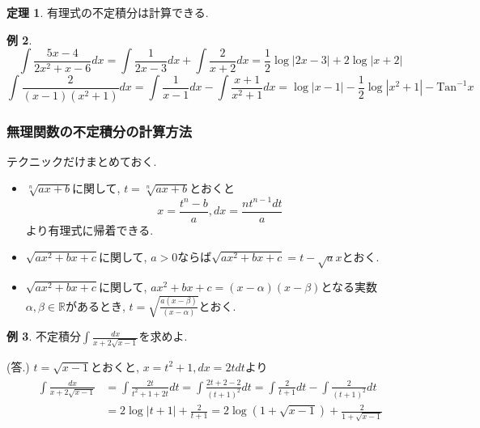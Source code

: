 \documentclass[dvipdfmx,a4paper,11pt]{article}
\newcommand{\R}{\mathbb{R}}
\newcommand{\Tan}{\text{Tan}^{-1}}
\theoremstyle{definition}
\newtheorem{thm}{定理}
\newtheorem{exa}[thm]{例}
\begin{document}
\begin{tcolorbox}[
    colback = white,
    colframe = green!35!black,
    fonttitle = \bfseries,
    breakable = true]
    \begin{thm}
有理式の不定積分は計算できる.
        \end{thm}
    \end{tcolorbox}
\begin{exa}
$$
\int \frac{5x -4 }{2x^2 + x -6}dx = \int \frac{1}{2x-3} dx+ \int \frac{2}{x+2}dx
= \frac{1}{2}\log|2x-3| + 2 \log |x+2|
$$
$$
\int \frac{2}{(x-1)(x^2 + 1)} dx = \int \frac{1}{x-1}dx  - \int \frac{x+1}{x^2 + 1}dx
= \log|x-1| - \frac{1}{2} \log |x^2+1|- \Tan x
$$
\end{exa}

\subsubsection{無理関数の不定積分の計算方法}

テクニックだけまとめておく.
\begin{itemize}
\item $\sqrt[n]{ax + b}$に関して, $t= \sqrt[n]{ax + b}$とおくと
$$
x = \frac{t^n - b}{a}, dx = \frac{n t^{n-1} dt}{a}
$$
より有理式に帰着できる.
\item $\sqrt{ax^2 + b x + c}$に関して, $a>0$ならば$\sqrt{ax^2 + b x + c} = t - \sqrt{a} x$とおく.
\item $\sqrt{ax^2 + b x + c}$に関して, $ax^2 + b x + c = (x - \alpha)(x- \beta)$となる実数$\alpha, \beta \in \R$があるとき, $t = \sqrt{\frac{a(x - \beta)}{(x-\alpha)}}$とおく.
\end{itemize}

\begin{exa}
不定積分$\int \frac{dx}{x + 2 \sqrt{x-1}}$を求めよ.

\hspace{-18pt}(答.) $t = \sqrt{x-1}$とおくと, $x = t^2 +1, dx = 2tdt$より
\begin{align*}
\begin{split}
\int \frac{dx}{x + 2 \sqrt{x-1}}
&= \int \frac{2t}{t^2 + 1 + 2t} dt= \int \frac{2t + 2 -2}{(t + 1)^2} dt 
=  \int \frac{2}{t + 1} dt -  \int \frac{2}{(t + 1)^2} dt \\
&= 2 \log |t+1| + \frac{2}{t+1} 
= 2 \log (1 + \sqrt{x-1}) + \frac{2}{1 + \sqrt{x-1}}
\end{split}
\end{align*}

\end{exa}
\end{document}
